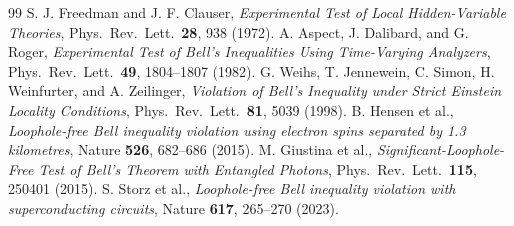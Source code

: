 \documentclass[11pt,a4paper]{article}
\begin{document}
\begin{thebibliography}{99}
 S. J. Freedman and J. F. Clauser, \textit{Experimental Test of Local Hidden-Variable Theories}, Phys.\ Rev.\ Lett.\ \textbf{28}, 938 (1972).
 A. Aspect, J. Dalibard, and G. Roger, \textit{Experimental Test of Bell's Inequalities Using Time-Varying Analyzers}, Phys.\ Rev.\ Lett.\ \textbf{49}, 1804--1807 (1982).
 G. Weihs, T. Jennewein, C. Simon, H. Weinfurter, and A. Zeilinger, \textit{Violation of Bell's Inequality under Strict Einstein Locality Conditions}, Phys.\ Rev.\ Lett.\ \textbf{81}, 5039 (1998).
 B. Hensen et al., \textit{Loophole-free Bell inequality violation using electron spins separated by 1.3 kilometres}, Nature \textbf{526}, 682--686 (2015).
 M. Giustina et al., \textit{Significant-Loophole-Free Test of Bell's Theorem with Entangled Photons}, Phys.\ Rev.\ Lett.\ \textbf{115}, 250401 (2015).
 S. Storz et al., \textit{Loophole-free Bell inequality violation with superconducting circuits}, Nature \textbf{617}, 265--270 (2023).
\end{thebibliography}
\end{document}

